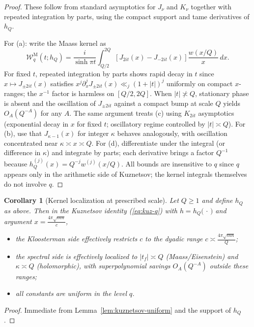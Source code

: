 \documentclass[11pt]{article}
\def\eqref#1{(\ref{#1})}%
\newtheorem{corollary}[lemma]{Corollary}
\theoremstyle{definition}
\theoremstyle{remark}
\numberwithin{equation}{part}
\begin{document}
\begin{proof}
	These follow from standard asymptotics for $J_\nu$ and $K_\nu$ together with repeated integration by parts, using the compact support and tame derivatives of $h_Q$.

	For (a): write the Maass kernel as
	\[
		\mathcal W_q^{\mathrm{M}}(t;h_Q)=\frac{i}{\sinh\pi t}\int_{Q/2}^{2Q}\!\left[J_{2it}(x)-J_{-2it}(x)\right]\frac{w(x/Q)}{x}\,dx.
	\]
	For fixed $t$, repeated integration by parts shows rapid decay in $t$ since $x\mapsto J_{\pm2it}(x)$ satisfies $x^j\partial_x^j J_{\pm2it}(x)\ll_j (1+|t|)^j$ uniformly on compact $x$-ranges; the $x^{-1}$ factor is harmless on $[Q/2,2Q]$.
	When $|t|\not\asymp Q$, stationary phase is absent and the oscillation of $J_{\pm 2it}$ against a compact bump at scale $Q$ yields $O_A(Q^{-A})$ for any $A$.
	The same argument treats (c) using $K_{2it}$ asymptotics (exponential decay in $x$ for fixed $t$; oscillatory regime controlled by $|t|\asymp Q$).
	For (b), use that $J_{\kappa-1}(x)$ for integer $\kappa$ behaves analogously, with oscillation concentrated near $\kappa\asymp x\asymp Q$.
	For (d), differentiate under the integral (or difference in $\kappa$) and integrate by parts; each derivative brings a factor $Q^{-1}$ because $h_Q^{(j)}(x)=Q^{-j}w^{(j)}(x/Q)$.
	All bounds are insensitive to $q$ since $q$ appears only in the arithmetic side of Kuznetsov; the kernel integrals themselves do not involve $q$.
\end{proof}

\begin{corollary}[Kernel localization at prescribed scale]\label{cor:kernel-localization}
	Let $Q\ge1$ and define $h_Q$ as above. Then in the Kuznetsov identity \eqref{eq:kuz-q} with $h=h_Q\big(\,\cdot\,\big)$ and argument $x=\tfrac{4\pi\sqrt{mn}}{c}$,
	\begin{itemize}[leftmargin=2em]
		\item the Kloosterman side effectively restricts $c$ to the dyadic range $c\asymp \tfrac{4\pi\sqrt{mn}}{Q}$;
		\item the spectral side is effectively localized to $|t_f|\asymp Q$ (Maass/Eisenstein) and $\kappa\asymp Q$ (holomorphic), with superpolynomial savings $O_A(Q^{-A})$ outside these ranges;
		\item all constants are uniform in the level $q$.
	\end{itemize}
\end{corollary}

\begin{proof}
	Immediate from Lemma~\ref{lem:kuznetsov-uniform} and the support of $h_Q$.
\end{proof}
\end{document}
